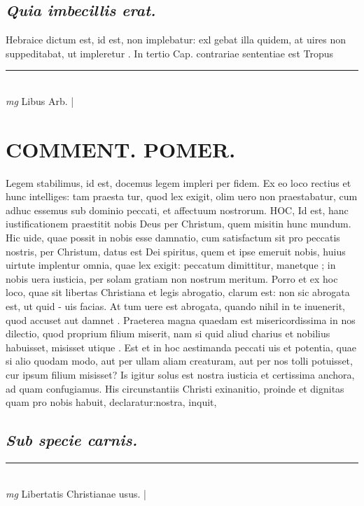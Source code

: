 \documentclass{article}
\begin{document}
\begin{pages}
\subsection*{\textit{Quia imbecillis erat. }}\pstart Hebraice dictum est, id est, non implebatur: exl gebat illa quidem, at uires non suppeditabat, ut impleretur . In tertio Cap. contrariae sententiae est Tropus  \pend
\vspace{0.5cm}\noindent
\vspace{0.2cm}\rule{1cm}{0.2pt}\\ 
\hspace{0.2cm}\textit{mg}
\footnotesize Libus Arb.  
\normalsize| 
\section*{COMMENT. POMER.  }\pstart Legem stabilimus, id est, docemus legem impleri per fidem. Ex eo loco rectius et hunc intelliges: tam praesta tur, quod lex exigit, olim uero non praestabatur, cum adhuc essemus sub dominio peccati, et affectuum nostrorum. HOC, Id est, hanc iustificationem praestitit nobis Deus per Christum, quem misitin hunc mundum. Hic uide, quae possit in nobis esse damnatio, cum satisfactum sit pro peccatis nostris, per Christum, datus est Dei spiritus, quem et ipse emeruit nobis, huius uirtute implentur omnia, quae lex exigit: peccatum dimittitur, manetque ; in nobis uera iusticia, per solam gratiam non nostrum meritum. Porro et ex hoc loco, quae sit libertas Christiana et legis abrogatio, clarum est: non sic abrogata est, ut quid - uis facias. At tum uere est abrogata, quando nihil in te inuenerit, quod accuset aut damnet . Praeterea magna quaedam est misericordissima in nos dilectio, quod proprium filium miserit, nam si quid aliud charius et nobilius habuisset, misisset utique . Est et in hoc aestimanda peccati uis et potentia, quae si alio quodam modo, aut per ullam aliam creaturam, aut per nos tolli potuisset, cur ipsum filium misisset? Is igitur solus est nostra iusticia et certissima anchora, ad quam confugiamus.   \pend\pstart His circunstantiis Christi exinanitio, proinde et dignitas quam pro nobis habuit, declaratur:nostra, inquit,  \pend
{}
{}
\subsection*{\textit{Sub specie carnis. }}
\vspace{0.5cm}\noindent
\vspace{0.2cm}\rule{1cm}{0.2pt}\\ 
\hspace{0.2cm}\textit{mg}
\footnotesize Libertatis Christianae usus.  
\normalsize| 

\end{pages}
\end{document}
